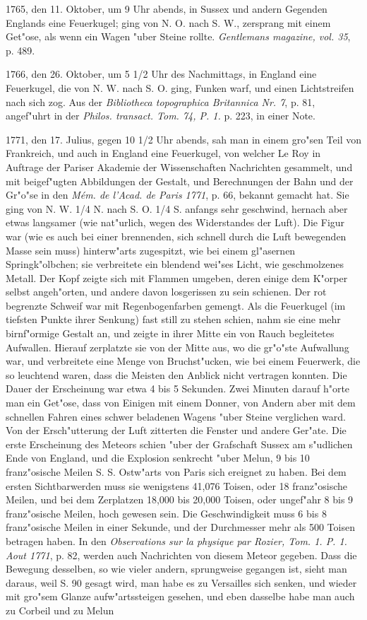 \documentclass[a4paper, 11pt, oneside, polutonikogreek, german]{article}
\begin{document}
1765, den 11. Oktober, um 9 Uhr abends, in Sussex und andern Gegenden Englands eine Feuerkugel; ging von N. O. nach S. W., zersprang mit einem Get"ose, als wenn ein Wagen "uber Steine rollte. \emph{Gentlemans magazine, vol. 35}, p. 489.

1766, den 26. Oktober, um 5 1/2 Uhr des Nachmittags, in England eine Feuerkugel, die von N. W. nach S. O. ging, Funken warf, und einen Lichtstreifen nach sich zog. Aus der \emph{Bibliotheca topographica Britannica Nr. 7}, p. 81, angef"uhrt in der \emph{Philos. transact. Tom. 74, P. 1.} p. 223, in einer Note.

1771, den 17. Julius, gegen 10 1/2 Uhr abends, sah man in einem gro"sen Teil von Frankreich, und auch in England eine Feuerkugel, von welcher Le Roy in Auftrage der Pariser Akademie der Wissenschaften Nachrichten gesammelt, und mit beigef"ugten Abbildungen der Gestalt, und Berechnungen der Bahn und der Gr"o"se in den \emph{Mém. de l'Acad. de Paris 1771}, p. 66, bekannt gemacht hat. Sie ging von N. W. 1/4 N. nach S. O. 1/4 S. anfangs sehr geschwind, hernach aber etwas langsamer (wie nat"urlich, wegen des Widerstandes der Luft). Die Figur war (wie es auch bei einer brennenden, sich schnell durch die Luft bewegenden Masse sein muss) hinterw"arts zugespitzt, wie bei einem gl"asernen Springk"olbchen; sie verbreitete ein blendend wei"ses Licht, wie geschmolzenes Metall. Der Kopf zeigte sich mit Flammen umgeben, deren einige dem K"orper selbst angeh"orten, und andere davon losgerissen zu sein schienen. Der rot begrenzte Schweif war mit Regenbogenfarben gemengt. Als die Feuerkugel (im tiefsten Punkte ihrer Senkung) fast still zu stehen schien, nahm sie eine mehr birnf"ormige Gestalt an, und zeigte in ihrer Mitte ein von Rauch begleitetes Aufwallen. Hierauf zerplatzte sie von der Mitte aus, wo die gr"o"ste Aufwallung war, und verbreitete eine Menge von Bruchst"ucken, wie bei einem Feuerwerk, die so leuchtend waren, dass die Meisten den Anblick nicht vertragen konnten. Die Dauer der Erscheinung war etwa 4 bis 5 Sekunden. Zwei Minuten darauf h"orte man ein Get"ose, dass von Einigen mit einem Donner, von Andern aber mit dem schnellen Fahren eines schwer beladenen Wagens "uber Steine verglichen ward. Von der Ersch"utterung der Luft zitterten die Fenster und andere Ger"ate. Die erste Erscheinung des Meteors schien "uber der Grafschaft Sussex am s"udlichen Ende von England, und die Explosion senkrecht "uber Melun, 9 bis 10 franz"osische Meilen S. S. Ostw"arts von Paris sich ereignet zu haben. Bei dem ersten Sichtbarwerden muss sie wenigstens 41,076 Toisen, oder 18 franz"osische Meilen, und bei dem Zerplatzen 18,000 bis 20,000 Toisen, oder ungef"ahr 8 bis 9 franz"osische Meilen, hoch gewesen sein. Die Geschwindigkeit muss 6 bis 8 franz"osische Meilen in einer Sekunde, und der Durchmesser mehr als 500 Toisen betragen haben. In den \emph{Observations sur la physique par Rozier, Tom. 1. P. 1. Aout 1771}, p. 82, werden auch Nachrichten von diesem Meteor gegeben. Dass die Bewegung desselben, so wie vieler andern, sprungweise gegangen ist, sieht man daraus, weil S. 90 gesagt wird, man habe es zu Versailles sich senken, und wieder mit gro"sem Glanze aufw"artssteigen gesehen, und eben dasselbe habe man auch zu Corbeil und zu Melun 
\end{document}

